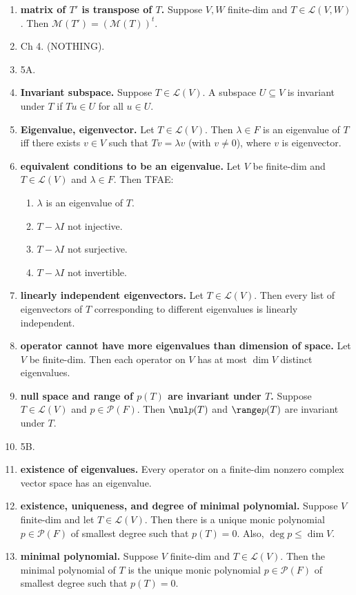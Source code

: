 \begin{enumerate}
	\item \textbf{matrix of $T'$ is transpose of $T$. } Suppose $V,W$ finite-dim and $T \in \mathscr{L}(V,W)$. Then $\mathscr{M}(T') = (\mathscr{M}(T))^t$. 
	\item Ch 4. (NOTHING). 
	\item 5A. 
	\item \textbf{Invariant subspace. } Suppose $T \in \mathscr{L}(V)$. A subspace $U \subseteq V$ is invariant under $T$ if $Tu \in U$ for all $u \in U$. 
	\item \textbf{Eigenvalue, eigenvector. } Let $T \in \mathscr{L}(V)$. Then $\lambda \in F$ is an eigenvalue of $T$ iff there exists $v \in V$ such that $Tv = \lambda v$ (with $v \neq 0$), where $v$ is eigenvector. 
	\item \textbf{equivalent conditions to be an eigenvalue. } Let $V$ be finite-dim and $T \in \mathscr{L}(V)$ and $\lambda \in F$. Then TFAE: 
	\begin{enumerate}
		\item $\lambda$ is an eigenvalue of $T$. 
		\item $T - \lambda I$ not injective. 
		\item $T - \lambda I$ not surjective. 
		\item $T - \lambda I$ not invertible. 
	\end{enumerate}
	\item \textbf{linearly independent eigenvectors. } Let $T \in \mathscr{L}(V)$. Then every list of eigenvectors of $T$ corresponding to different eigenvalues is linearly independent. 
	\item \textbf{operator cannot have more eigenvalues than dimension of space. } Let $V$ be finite-dim. Then each operator on $V$ has at most $\dim V$ distinct eigenvalues. 
	\item \textbf{null space and range of $p(T)$ are invariant under $T$. } Suppose $T \in \mathscr{L}(V)$ and $p \in \mathscr{P}(F)$. Then $\nul p(T)$ and $\range p(T)$ are invariant under $T$. 
	\item 5B. 
	\item \textbf{existence of eigenvalues. } Every operator on a finite-dim nonzero complex vector space has an eigenvalue. 
	\item \textbf{existence, uniqueness, and degree of minimal polynomial. } Suppose $V$ finite-dim and let $T \in \mathscr{L}(V)$. Then there is a unique monic polynomial $p \in \mathscr{P}(F)$ of smallest degree such that $p(T)=0$. Also, $\deg p \leq \dim V$. 
	\item \textbf{minimal polynomial. } Suppose $V$ finite-dim and $T \in \mathscr{L}(V)$. Then the minimal polynomial of $T$ is the unique monic polynomial $p \in \mathscr{P}(F)$ of smallest degree such that $p(T)=0$. 

\end{enumerate}
